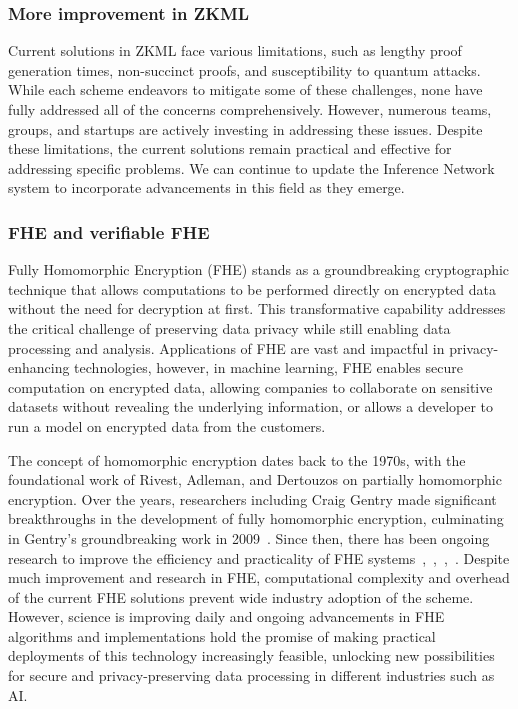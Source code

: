 \documentclass[conference]{IEEEtran}
\begin{document}
\subsubsection{More improvement in ZKML}

Current solutions in ZKML face various limitations, such as lengthy proof generation times, non-succinct proofs, and susceptibility to quantum attacks. While each scheme endeavors to mitigate some of these challenges, none have fully addressed all of the concerns comprehensively. However, numerous teams, groups, and startups are actively investing in addressing these issues. Despite these limitations, the current solutions remain practical and effective for addressing specific problems. We can continue to update the Inference Network system to incorporate advancements in this field as they emerge.

\subsubsection{FHE and verifiable FHE}

Fully Homomorphic Encryption (FHE) stands as a groundbreaking cryptographic technique that allows computations to be performed directly on encrypted data without the need for decryption at first. This transformative capability addresses the critical challenge of preserving data privacy while still enabling data processing and analysis. Applications of FHE are vast and impactful in privacy-enhancing technologies, however, in machine learning, FHE enables secure computation on encrypted data, allowing companies to collaborate on sensitive datasets without revealing the underlying information, or allows a developer to run a model on encrypted data from the customers.

The concept of homomorphic encryption dates back to the 1970s, with the foundational work of Rivest, Adleman, and Dertouzos on partially homomorphic encryption. Over the years, researchers including Craig Gentry made significant breakthroughs in the development of fully homomorphic encryption, culminating in Gentry’s groundbreaking work in 2009~\cite{Gentry2009FullyHE}. Since then, there has been ongoing research to improve the efficiency and practicality of FHE systems~\cite{Dijk2010FullyHE},~\cite{Brakerski2012LeveledFH},~\cite{Gentry2013HomomorphicEF},~\cite{Cheon2017HomomorphicEF}. Despite much improvement and research in FHE, computational complexity and overhead of the current FHE solutions prevent wide industry adoption of the scheme. However, science is improving daily and ongoing advancements in FHE algorithms and implementations hold the promise of making practical deployments of this technology increasingly feasible, unlocking new possibilities for secure and privacy-preserving data processing in different industries such as AI.
\end{document}
